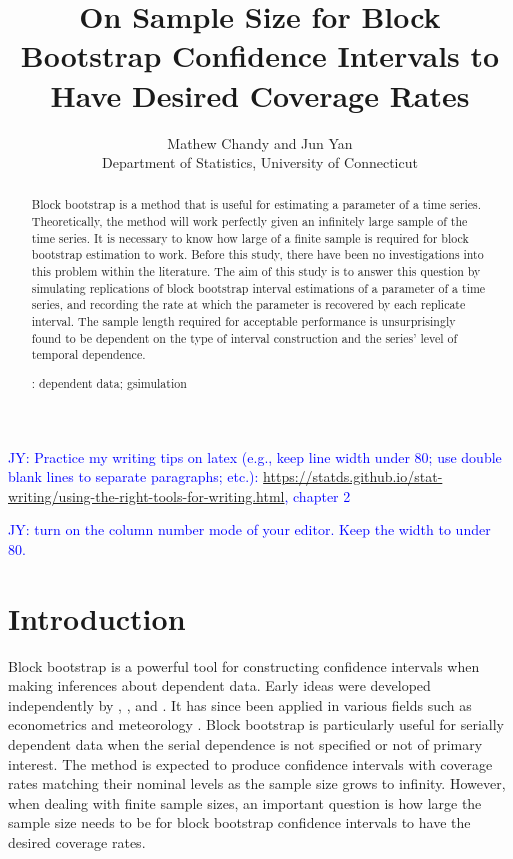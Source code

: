 \documentclass[12pt, letterpaper, titlepage]{article}
\title{On Sample Size for Block Bootstrap Confidence Intervals 
  to Have Desired Coverage Rates}
\author{Mathew Chandy
  and Jun Yan\\[1ex]
  Department of Statistics, University of Connecticut\\
}
\date{}
\newcommand{\jy}[1]{\textcolor{blue}{JY: #1}}
\begin{document}
 
\maketitle

\begin{abstract}
Block bootstrap is a method that is useful for estimating a parameter of a time
series. Theoretically, the method will work perfectly given an infinitely
large sample of the time series. It is necessary to know how large of a finite
sample is required for block bootstrap estimation to work. Before this study,
there have been no investigations into this problem within the literature. The
aim of this study is to answer this question by simulating replications of
block bootstrap interval estimations of a parameter of a time series, and
recording the rate at which the parameter is recovered by each replicate
interval. The sample length required for acceptable performance is
unsurprisingly found to be dependent on the type of interval construction and
the series' level of temporal dependence.


\bigskip
{}:
dependent data; gsimulation
\end{abstract}

\doublespace

\jy{Practice my writing tips on latex (e.g., keep line width under 80; use
  double blank lines to separate paragraphs; etc.):
  \url{
https://statds.github.io/stat-writing/using-the-right-tools-for-writing.html},
  chapter 2}

\jy{turn on the column number mode of your editor. Keep the width to under 80.}


\section{Introduction}
\label{sec:intro}

Block bootstrap is a powerful tool for constructing confidence intervals when
making inferences about dependent data. Early ideas were developed
independently by \citet{hall1985resampling}, \citet{carlstein1986use}, and 
\citet{kunsch1989jackknife}.
It has since been applied in various fields such as econometrics
\citep{mackinnon2006bootstrap} and meteorology \citep{varga2017generalised}.
Block bootstrap is particularly useful for serially dependent
data when the serial dependence is not specified or not of primary interest.
The method is expected to produce confidence intervals with coverage rates
matching their nominal levels as the sample size grows to infinity. However,
when dealing with finite sample sizes, an important question is how large the
sample size needs to be for block bootstrap confidence intervals to have the
desired coverage rates.
\end{document}
